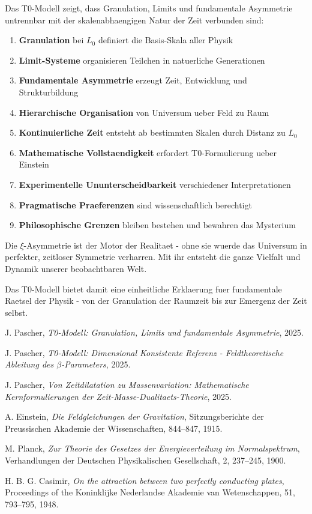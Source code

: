 \documentclass[12pt,a4paper]{article}
\newcommand{\xipar}{\xi}
\newcommand{\Lzero}{L_0}
\theoremstyle{definition}
\theoremstyle{remark}
\begin{document}
	Das T0-Modell zeigt, dass Granulation, Limits und fundamentale Asymmetrie untrennbar mit der skalenabhaengigen Natur der Zeit verbunden sind:
	
	\begin{enumerate}
		\item \textbf{Granulation} bei $\Lzero$ definiert die Basis-Skala aller Physik
		\item \textbf{Limit-Systeme} organisieren Teilchen in natuerliche Generationen
		\item \textbf{Fundamentale Asymmetrie} erzeugt Zeit, Entwicklung und Strukturbildung
		\item \textbf{Hierarchische Organisation} von Universum ueber Feld zu Raum
		\item \textbf{Kontinuierliche Zeit} entsteht ab bestimmten Skalen durch Distanz zu $\Lzero$
		\item \textbf{Mathematische Vollstaendigkeit} erfordert T0-Formulierung ueber Einstein
		\item \textbf{Experimentelle Ununterscheidbarkeit} verschiedener Interpretationen
		\item \textbf{Pragmatische Praeferenzen} sind wissenschaftlich berechtigt
		\item \textbf{Philosophische Grenzen} bleiben bestehen und bewahren das Mysterium
	\end{enumerate}
	
	Die $\xipar$-Asymmetrie ist der Motor der Realitaet - ohne sie wuerde das Universum in perfekter, zeitloser Symmetrie verharren. Mit ihr entsteht die ganze Vielfalt und Dynamik unserer beobachtbaren Welt.
	
	Das T0-Modell bietet damit eine einheitliche Erklaerung fuer fundamentale Raetsel der Physik - von der Granulation der Raumzeit bis zur Emergenz der Zeit selbst.
	
	\begin{thebibliography}{99}
		J. Pascher, \textit{T0-Modell: Granulation, Limits und fundamentale Asymmetrie}, 2025.
		
		J. Pascher, \textit{T0-Modell: Dimensional Konsistente Referenz - Feldtheoretische Ableitung des $\beta$-Parameters}, 2025.
		
		J. Pascher, \textit{Von Zeitdilatation zu Massenvariation: Mathematische Kernformulierungen der Zeit-Masse-Dualitaets-Theorie}, 2025.
		
		A. Einstein, \textit{Die Feldgleichungen der Gravitation}, Sitzungsberichte der Preussischen Akademie der Wissenschaften, 844--847, 1915.
		
		M. Planck, \textit{Zur Theorie des Gesetzes der Energieverteilung im Normalspektrum}, Verhandlungen der Deutschen Physikalischen Gesellschaft, 2, 237--245, 1900.
		
		H. B. G. Casimir, \textit{On the attraction between two perfectly conducting plates}, Proceedings of the Koninklijke Nederlandse Akademie van Wetenschappen, 51, 793--795, 1948.
	\end{thebibliography}
	
\end{document}
